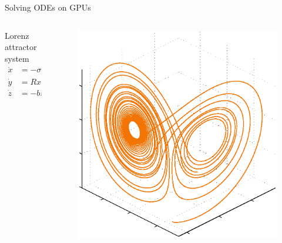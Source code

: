 \documentclass[@BEAMER_OPTIONS@]{beamer}
\begin{document}
\note{}

\begin{frame}{Solving ODEs on GPUs}
    \vspace{-1\baselineskip}
    \begin{columns}
        \begin{column}{0.5\textwidth}
            \begin{block}{Lorenz attractor system}
                \vspace{-1\baselineskip}
                \begin{align*}
                    \dot{x} &= -\sigma \left( x - y \right), \\
                    \dot{y} &= R x - y - xz, \\
                    \dot{z} &= -bz + xy.
                    \label{eq:lorenz}
                \end{align*}
            \end{block}
        \end{column}
        \begin{column}{0.4\textwidth}
            \begin{figure}
                \includegraphics[width=\textwidth]{lorenz}
            \end{figure}

\end{column}
\end{columns}
\end{frame}
\end{document}

